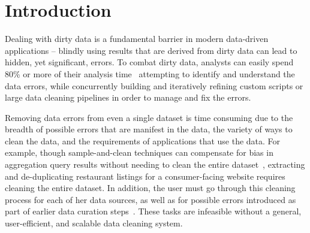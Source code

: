 \section{Introduction}\label{sec:intro}


%
%
Dealing with dirty data is a fundamental barrier in modern data-driven applications -- 
blindly using results that are derived from dirty data can lead to hidden, yet significant, errors.
To combat dirty data, analysts can easily spend 80\% or more of their analysis 
time~\cite{kandel2012} attempting to identify and understand the data errors, 
while concurrently building and iteratively refining custom scripts or large data cleaning pipelines 
in order to manage and fix the errors.  

Removing data errors from even a single dataset is 
time consuming due to the breadth of possible errors that are manifest in the data,
the variety of ways to clean the data, and the requirements of applications that use the data.
For example, though sample-and-clean techniques can compensate for bias in aggregation query 
results without needing to clean the entire dataset~\cite{wang1999sample}, extracting and de-duplicating
restaurant listings for a consumer-facing website requires cleaning the entire dataset.
In addition, the user must go through this cleaning process for each of her data sources, as well as
for possible errors introduced as part of earlier data curation steps~\cite{}.
These tasks are infeasible without a general, user-efficient, and scalable data cleaning system.





